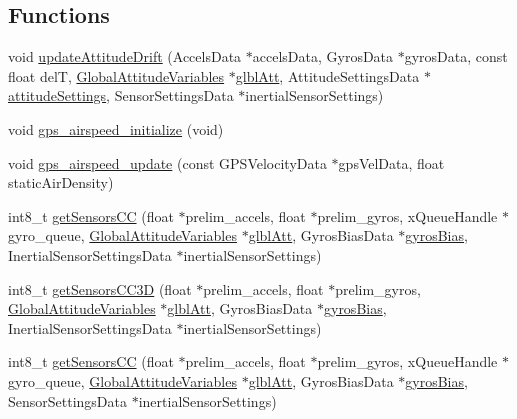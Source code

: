 \subsection*{\-Functions}
\begin{DoxyCompactItemize}
\item 
void \hyperlink{group___c_c_state_gacf73f90ae39bfb7e42e688376f9cf5ef}{update\-Attitude\-Drift} (\-Accels\-Data $\ast$accels\-Data, \-Gyros\-Data $\ast$gyros\-Data, const float del\-T, \hyperlink{struct_global_attitude_variables}{\-Global\-Attitude\-Variables} $\ast$\hyperlink{group___c_c_state_ga76682d72011dc0109f1d5cf25a6c6da0}{glbl\-Att}, \-Attitude\-Settings\-Data $\ast$\hyperlink{group___c_c_state_ga8f6543ab52bafea6c0858baeeae8db59}{attitude\-Settings}, \-Sensor\-Settings\-Data $\ast$inertial\-Sensor\-Settings)
\item 
void \hyperlink{group___c_c_state_gaaedab067f447c531ce7d8339c7f06e54}{gps\-\_\-airspeed\-\_\-initialize} (void)
\item 
void \hyperlink{group___c_c_state_gaf9e1d79b501c8669dc10e519ec0930a2}{gps\-\_\-airspeed\-\_\-update} (const \-G\-P\-S\-Velocity\-Data $\ast$gps\-Vel\-Data, float static\-Air\-Density)
\item 
int8\-\_\-t \hyperlink{group___c_c_state_ga7b51e65077e182551c02a9906849c8d8}{get\-Sensors\-C\-C} (float $\ast$prelim\-\_\-accels, float $\ast$prelim\-\_\-gyros, x\-Queue\-Handle $\ast$gyro\-\_\-queue, \hyperlink{struct_global_attitude_variables}{\-Global\-Attitude\-Variables} $\ast$\hyperlink{group___c_c_state_ga76682d72011dc0109f1d5cf25a6c6da0}{glbl\-Att}, \-Gyros\-Bias\-Data $\ast$\hyperlink{group___c_c_state_ga233a2d6850e9c466f80ae6bb2ebd98e8}{gyros\-Bias}, \-Inertial\-Sensor\-Settings\-Data $\ast$inertial\-Sensor\-Settings)
\item 
int8\-\_\-t \hyperlink{group___c_c_state_ga13859f6d28a13807ea66fa653165ba0e}{get\-Sensors\-C\-C3\-D} (float $\ast$prelim\-\_\-accels, float $\ast$prelim\-\_\-gyros, \hyperlink{struct_global_attitude_variables}{\-Global\-Attitude\-Variables} $\ast$\hyperlink{group___c_c_state_ga76682d72011dc0109f1d5cf25a6c6da0}{glbl\-Att}, \-Gyros\-Bias\-Data $\ast$\hyperlink{group___c_c_state_ga233a2d6850e9c466f80ae6bb2ebd98e8}{gyros\-Bias}, \-Inertial\-Sensor\-Settings\-Data $\ast$inertial\-Sensor\-Settings)
\item 
int8\-\_\-t \hyperlink{group___c_c_state_ga525bb97712e9393c390475f4b14ad6ac}{get\-Sensors\-C\-C} (float $\ast$prelim\-\_\-accels, float $\ast$prelim\-\_\-gyros, x\-Queue\-Handle $\ast$gyro\-\_\-queue, \hyperlink{struct_global_attitude_variables}{\-Global\-Attitude\-Variables} $\ast$\hyperlink{group___c_c_state_ga76682d72011dc0109f1d5cf25a6c6da0}{glbl\-Att}, \-Gyros\-Bias\-Data $\ast$\hyperlink{group___c_c_state_ga233a2d6850e9c466f80ae6bb2ebd98e8}{gyros\-Bias}, \-Sensor\-Settings\-Data $\ast$inertial\-Sensor\-Settings)

\end{DoxyCompactItemize}
